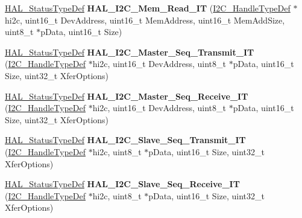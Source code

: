 \begin{DoxyCompactItemize}
\mbox{\hyperlink{stm32f7xx__hal__def_8h_a63c0679d1cb8b8c684fbb0632743478f}{H\+A\+L\+\_\+\+Status\+Type\+Def}} {\bfseries H\+A\+L\+\_\+\+I2\+C\+\_\+\+Mem\+\_\+\+Read\+\_\+\+IT} (\mbox{\hyperlink{struct_____i2_c___handle_type_def}{I2\+C\+\_\+\+Handle\+Type\+Def}} $\ast$hi2c, uint16\+\_\+t Dev\+Address, uint16\+\_\+t Mem\+Address, uint16\+\_\+t Mem\+Add\+Size, uint8\+\_\+t $\ast$p\+Data, uint16\+\_\+t Size)
\item 
\mbox{\label{group___i2_c___exported___functions___group2_ga6a55d04a460664f6b2039b2a7b56a9de}} 
\mbox{\hyperlink{stm32f7xx__hal__def_8h_a63c0679d1cb8b8c684fbb0632743478f}{H\+A\+L\+\_\+\+Status\+Type\+Def}} {\bfseries H\+A\+L\+\_\+\+I2\+C\+\_\+\+Master\+\_\+\+Seq\+\_\+\+Transmit\+\_\+\+IT} (\mbox{\hyperlink{struct_____i2_c___handle_type_def}{I2\+C\+\_\+\+Handle\+Type\+Def}} $\ast$hi2c, uint16\+\_\+t Dev\+Address, uint8\+\_\+t $\ast$p\+Data, uint16\+\_\+t Size, uint32\+\_\+t Xfer\+Options)
\item 
\mbox{\label{group___i2_c___exported___functions___group2_ga0caa34de50971b2bd5b953ee12af94f1}} 
\mbox{\hyperlink{stm32f7xx__hal__def_8h_a63c0679d1cb8b8c684fbb0632743478f}{H\+A\+L\+\_\+\+Status\+Type\+Def}} {\bfseries H\+A\+L\+\_\+\+I2\+C\+\_\+\+Master\+\_\+\+Seq\+\_\+\+Receive\+\_\+\+IT} (\mbox{\hyperlink{struct_____i2_c___handle_type_def}{I2\+C\+\_\+\+Handle\+Type\+Def}} $\ast$hi2c, uint16\+\_\+t Dev\+Address, uint8\+\_\+t $\ast$p\+Data, uint16\+\_\+t Size, uint32\+\_\+t Xfer\+Options)
\item 
\mbox{\label{group___i2_c___exported___functions___group2_ga6d4024eb28117e0836c2477a855d7531}} 
\mbox{\hyperlink{stm32f7xx__hal__def_8h_a63c0679d1cb8b8c684fbb0632743478f}{H\+A\+L\+\_\+\+Status\+Type\+Def}} {\bfseries H\+A\+L\+\_\+\+I2\+C\+\_\+\+Slave\+\_\+\+Seq\+\_\+\+Transmit\+\_\+\+IT} (\mbox{\hyperlink{struct_____i2_c___handle_type_def}{I2\+C\+\_\+\+Handle\+Type\+Def}} $\ast$hi2c, uint8\+\_\+t $\ast$p\+Data, uint16\+\_\+t Size, uint32\+\_\+t Xfer\+Options)
\item 
\mbox{\label{group___i2_c___exported___functions___group2_ga1e782a3b10d12e4368eb489ad728e735}} 
\mbox{\hyperlink{stm32f7xx__hal__def_8h_a63c0679d1cb8b8c684fbb0632743478f}{H\+A\+L\+\_\+\+Status\+Type\+Def}} {\bfseries H\+A\+L\+\_\+\+I2\+C\+\_\+\+Slave\+\_\+\+Seq\+\_\+\+Receive\+\_\+\+IT} (\mbox{\hyperlink{struct_____i2_c___handle_type_def}{I2\+C\+\_\+\+Handle\+Type\+Def}} $\ast$hi2c, uint8\+\_\+t $\ast$p\+Data, uint16\+\_\+t Size, uint32\+\_\+t Xfer\+Options)

\end{DoxyCompactItemize}
